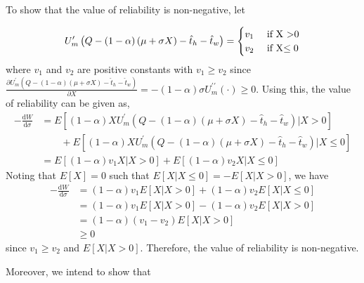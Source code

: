 \documentclass[12pt,a4paper,british]{article}
\makeatletter
\theoremstyle{definition}
\theoremstyle{plain}
\newenvironment{proof}[1][\proofname]{\par
    \normalfont\topsep6\p@\@plus6\p@\relax
    \trivlist
    \itemindent\parindent
    \item[\hskip\labelsep
          \scshape
      #1]\ignorespaces
  }{%
    \endtrivlist\@endpefalse
  }
\providecommand{\proofname}{Proof}
\theoremstyle{plain}
\makeatother
\begin{document}
\begin{proof}
To show that the value of reliability is non-negative, let

\[
U_{m}^{\prime}\left(Q-\left(1-\alpha\right)\left(\mu+\sigma X\right)-\hat{t}_{h}-\hat{t}_{w}\right)=\begin{cases}
v_{1} & \mbox{ if X >0}\\
v_{2} & \mbox{ if X\ensuremath{\leq0}}
\end{cases}
\]
where $v_{1}$ and $v_{2}$ are positive constants with $v_{1}\geq v_{2}$
since $\frac{\partial U_{m}^{\prime}\left(Q-\left(1-\alpha\right)\left(\mu+\sigma X\right)-\hat{t}_{h}-\hat{t}_{w}\right)}{\partial X}=-\left(1-\alpha\right)\sigma U_{m}^{\prime\prime}\left(\cdot\right)\geq0$.
Using this, the value of reliability can be given as,
\begin{align*}
-\frac{\mathrm{d}W}{\mathrm{d}\sigma} & =E\left[\left(1-\alpha\right)XU_{m}^{\prime}\left(Q-\left(1-\alpha\right)\left(\mu+\sigma X\right)-\hat{t}_{h}-\hat{t}_{w}\right)\vert X>0\right]\\
 & \qquad+E\left[\left(1-\alpha\right)XU_{m}^{\prime}\left(Q-\left(1-\alpha\right)\left(\mu+\sigma X\right)-\hat{t}_{h}-\hat{t}_{w}\right)\vert X\leq0\right]\\
 & =E\left[\left(1-\alpha\right)v_{1}X\vert X>0\right]+E\left[\left(1-\alpha\right)v_{2}X\vert X\leq0\right]
\end{align*}
Noting that $E\left[X\right]=0$ such that $E\left[X\vert X\leq0\right]=-E\left[X\vert X>0\right]$,
we have
\begin{align*}
-\frac{\mathrm{d}W}{\mathrm{d}\sigma} & =\left(1-\alpha\right)v_{1}E\left[X\vert X>0\right]+\left(1-\alpha\right)v_{2}E\left[X\vert X\leq0\right]\\
 & =\left(1-\alpha\right)v_{1}E\left[X\vert X>0\right]-\left(1-\alpha\right)v_{2}E\left[X\vert X>0\right]\\
 & =\left(1-\alpha\right)\left(v_{1}-v_{2}\right)E\left[X\vert X>0\right]\\
 & \geq0
\end{align*}
since $v_{1}\geq v_{2}$ and $E\left[X\vert X>0\right]$. Therefore,
the value of reliability is non-negative.

Moreover, we intend to show that


\end{proof}
\end{document}
